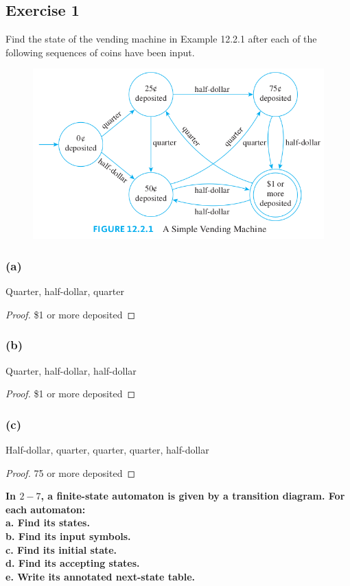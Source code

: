 \documentclass[14pt]{extarticle}
\newcommand{\cy}{\color{cyan}}
\begin{document}
\subsection{Exercise 1}
Find the state of the vending machine in Example 12.2.1 after each of the following sequences of coins have been input.

\begin{figure}[ht!]
    \centering
    \includegraphics[scale=0.4]{../images/12.2.1.png}
\end{figure}

\subsubsection{(a)}
Quarter, half-dollar, quarter
\begin{proof}
    \$1 or more deposited
\end{proof}

\subsubsection{(b)}
Quarter, half-dollar, half-dollar
\begin{proof}
    \$1 or more deposited
\end{proof}

\subsubsection{(c)}
Half-dollar, quarter, quarter, quarter, half-dollar
\begin{proof}
    75\textcentoldstyle{} or more deposited
\end{proof}

{\bf \cy In \(2-7\), a finite-state automaton is given by a transition diagram. For each automaton: \\
a. Find its states. \\
b. Find its input symbols. \\
c. Find its initial state. \\
d. Find its accepting states. \\
e. Write its annotated next-state table.}
\end{document}

